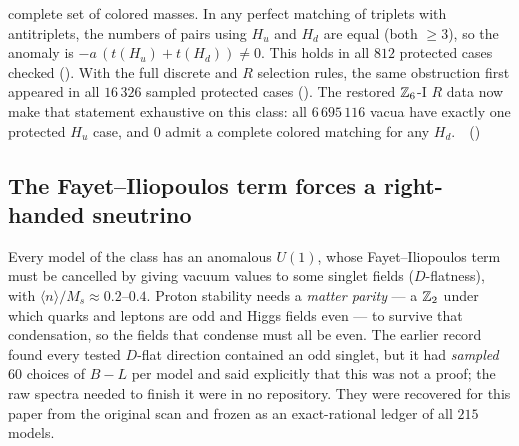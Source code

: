 complete set of colored masses. In any perfect matching of triplets with antitriplets, the numbers of pairs using
$H_u$ and $H_d$ are equal (both $\ge3$), so the anomaly is $-a\,(t(H_u)+t(H_d))\neq0$. This holds in all $812$
protected cases checked (). With the full discrete and $R$ selection rules, the same obstruction first appeared in all $16\,326$ sampled protected cases (). The restored $\mathbb{Z}_6$-I $R$ data now make that statement exhaustive on this class: all $6\,695\,116$ vacua have exactly one protected $H_u$ case, and $0$ admit a complete colored matching for any $H_d$. \tierT\,\tierC\ ()

\subsection{The Fayet--Iliopoulos term forces a right-handed sneutrino}
\label{sec:sneutrino}

Every model of the class has an anomalous $U(1)$, whose Fayet--Iliopoulos term must be
cancelled by giving vacuum values to some singlet fields ($D$-flatness), with $\langle
n\rangle/M_s\approx0.2$--$0.4$. Proton stability needs a \emph{matter parity} --- a $\mathbb{Z}_2$
under which quarks and leptons are odd and Higgs fields even --- to survive that
condensation, so the fields that condense must all be even. The earlier record found every
tested $D$-flat direction contained an odd singlet, but it had \emph{sampled} $60$ choices of
$B-L$ per model and said explicitly that this was not a proof; the raw spectra needed to
finish it were in no repository. They were recovered for this paper from the original scan
and frozen as an exact-rational ledger of all $215$ models.

